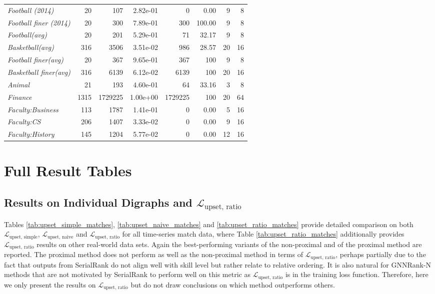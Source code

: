 \documentclass[nohyperref]{article}
\theoremstyle{plain}
\theoremstyle{definition}
\theoremstyle{remark}
\begin{document}
\begin{table}[tb!]
{\begin{tabular}{lrrrrrrr}
\textit{Football (2014)}&20&107&2.82e-01&0&0.00&9&8\\
\textit{Football finer (2014)}&20&300&7.89e-01&300&100.00&9&8\\
\textit{Football(avg)}&20&201&5.29e-01&71&32.17&9&8\\
\textit{Basketball(avg)}&316&3506&3.51e-02&986&28.57&20&16\\
\textit{Football finer(avg)}&20&367&9.65e-01&367&100&9&8\\
\textit{Basketball finer(avg)}&316&6139&6.12e-02&6139&100&20&16\\
\textit{Animal}&21&193&4.60e-01&64&33.16&3&8\\
\textit{Finance}&1315&1729225&1.00e+00&1729225&100&20&64\\
\textit{Faculty:Business}&113&1787&1.41e-01&0&0.00&5&16\\
\textit{Faculty:CS}&206&1407&3.33e-02&0&0.00&9&16\\
\textit{Faculty:History}&145&1204&5.77e-02&0&0.00&12&16\\
\bottomrule
\end{tabular}}
\end{table}
\section{Full Result Tables}
\label{appendix_sec:full_result_tables}


\subsection{Results on Individual Digraphs and $\mathcal{L}_\text{upset, ratio}$}
\label{appendix_subsec:individuals}
Tables \ref{tab:upset_simple_matches}, \ref{tab:upset_naive_matches} and \ref{tab:upset_ratio_matches} provide detailed comparison on both $\mathcal{L}_\text{upset, simple}$, $\mathcal{L}_\text{upset, naive}$ and $\mathcal{L}_\text{upset, ratio}$ for all time-series match data, where Table \ref{tab:upset_ratio_matches} additionally provides $\mathcal{L}_\text{upset, ratio}$ results on other real-world data sets. Again the best-performing variants of the non-proximal and of the proximal method are reported. The proximal method does not perform as well as the non-proximal method in terms of $\mathcal{L}_\text{upset, ratio}$, perhaps partially due to the fact that outputs from SerialRank \cite{fogel2014SerialRank} do not align well with skill level but rather 
relate to relative ordering. It is also natural for GNNRank-N methods that are not motivated by SerialRank to perform well on this metric as $\mathcal{L}_\text{upset, ratio}$ is in the training loss function. Therefore, here we only
present the results on $\mathcal{L}_\text{upset, ratio}$ but do not 
draw conclusions on which method outperforms others.
\end{document}
